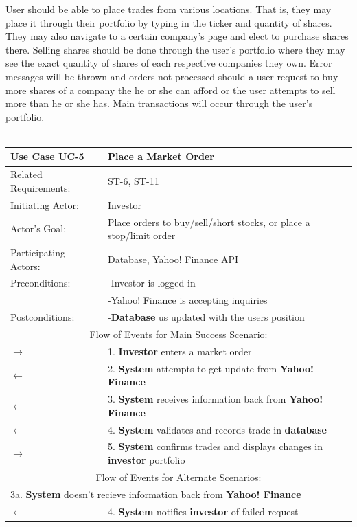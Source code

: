 User should be able to place trades from various locations. That is, they may place it through
their portfolio by typing in the ticker and quantity of shares. They may also navigate to a
certain company’s page and elect to purchase shares there. Selling shares should be done
through the user’s portfolio where they may see the exact quantity of shares of each respective
companies they own. Error messages will be thrown and orders not processed should a user request
to buy more shares of a company the he or she can afford or the user attempts to sell more than
he or she has. Main transactions will occur through the user’s portfolio. \\ \\

\begin{centering}
\label{UC-5}
\renewcommand\arraystretch{1.3}
\begin{longtable}{|p{1.2in} p{5in}|}
\hline
\bfseries{\color{color1}Use Case UC-5} &
\bfseries{\color{color1}Place a Market Order} \\
\hline
Related Requirements: & ST-6, ST-11 \\
Initiating Actor:     & Investor \\
Actor's Goal:         & Place orders to buy/sell/short stocks, or place a stop/limit order \\
Participating Actors: & Database, Yahoo! Finance API \\
Preconditions:        & -Investor is logged in \\
                      & -Yahoo! Finance is accepting inquiries \\
Postconditions:       & -\textbf{Database} us updated with the users position \\
\hline
\multicolumn{2}{|c|}{\color{color1}Flow of Events for Main Success Scenario:}\\
\hline

$\rightarrow$ & 1. \textbf{Investor} enters a market order \\
$\leftarrow$ & 2. \textbf{System} attempts to get update from \textbf{Yahoo! Finance} \\
$\leftarrow$ & 3. \textbf{System} receives information back from \textbf{Yahoo! Finance} \\
$\leftarrow$ & 4. \textbf{System} validates and records trade in \textbf{database} \\
$\rightarrow$ & 5. \textbf{System} confirms trades and displays changes in \textbf{investor}
portfolio\\
\hline

\multicolumn{2}{|c|}{\color{color1}Flow of Events for Alternate Scenarios:} \\
\hline

\multicolumn{2}{|p{6.2in}|}{3a. \textbf{System} doesn't recieve information back from
\textbf{Yahoo! Finance}} \\
\hline

$\leftarrow$ & 4. \textbf{System} notifies \textbf{investor} of failed request \\
\hline

\end{longtable}
\end{centering}

